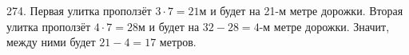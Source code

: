 274. Первая улитка проползёт $3\cdot7=21$м и будет на 21-м метре дорожки. Вторая улитка проползёт $4\cdot7=28$м и будет на $32-28=4$-м метре дорожки. Значит, между ними будет $21-4=17$ метров.\\
